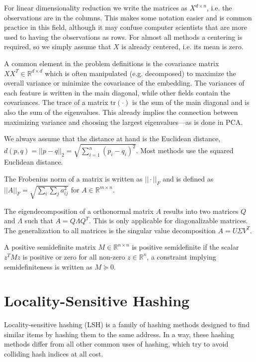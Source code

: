 For linear dimensionality reduction we write the matrices as $X^{d \times n}$, i.e. the
observations are in the columns. This makes some notation easier and is common practice
in this field, although it may confuse computer scientists that are more used to having
the observations as rows. For almost all methods a centering is required, so we simply
assume that $X$ is already centered, i.e. its mean is zero.

A common element in the problem definitions is the covariance matrix $XX^T \in \mathbb{R}^{d \times d}$ which is
often manipulated (e.g. decomposed) to maximize the overall variance or minimize
the covariance of the embedding. The variances of each feature is written in the main diagonal,
while other fields contain the covariances. The trace of a matrix $\text{tr}(\cdot)$
is the sum of the main diagonal and is also the sum of the eigenvalues. This already
implies the connection between maximizing variance and choosing the largest
eigenvalues---as is done in PCA.

We always assume that the distance at hand is the Euclidean distance, $d(p,q) =
|| p - q ||_2 = \sqrt{\sum_{i=1}^n (p_i - q_i)^2}$.  Most methods use the
squared Euclidean distance.

The Frobenius norm of a matrix is written as $|| \cdot ||_F$ and is defined as
$|| A ||_F = \sqrt{\sum_i \sum_j  a_{ij}^2}$ for $A \in \mathbb{R}^{m \times n}$.

The eigendecomposition of a orthonormal matrix $A$ results into two matrices $Q$ and $\Lambda$
such that $A = Q\Lambda Q^T$. This is only applicable for diagonalizable matrices.
The generalization to all matrices is the singular value decomposition $A = U \Sigma V^T$.

A positive semidefinite matrix $M \in \mathbb{R}^{n \times n}$ is positive semidefinite
if the scalar $z^TMz$ is positive or zero for all non-zero $z \in \mathbb{R}^n$, a constraint
implying semidefiniteness is written as $M \succeq 0$.

\section{Locality-Sensitive Hashing}

Locality-sensitive hashing (LSH) is a family of hashing methods designed
to find similar items by hashing them to the same address. In a way, these
hashing methods differ from all other common uses of hashing, which try
to avoid colliding hash indices at all cost.

